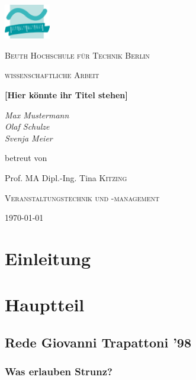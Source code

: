 
\begin{titlepage}
	\centering
	\includegraphics[width=0.15\textwidth]{img/beuth.png}\par\vspace{1cm}
	{\scshape\LARGE Beuth Hochschule für Technik Berlin \par}
	\vspace{1cm}
	{\scshape\Large wissenschaftliche Arbeit\par}
	\vspace{1.5cm}
	{\huge\bfseries [Hier könnte ihr Titel stehen]\par}
	\vspace{2cm}
	{\Large\itshape Max Mustermann\\Olaf Schulze\\Svenja Meier\par}
	\vfill
	betreut von\par
	Prof. MA Dipl.-Ing. Tina \textsc{Kitzing}

	\vfill
	{\scshape\Large Veranstaltungstechnik und -management\par}
	
	{\large \today\par} %
\end{titlepage}

\clearpage
\printnoidxglossaries

\clearpage
\tableofcontents
\clearpage

\section{Einleitung}
\blindtext

\clearpage
\section{Hauptteil}


\subsection{Rede Giovanni Trapattoni '98} %

\subsubsection{Was erlauben Strunz?} %


